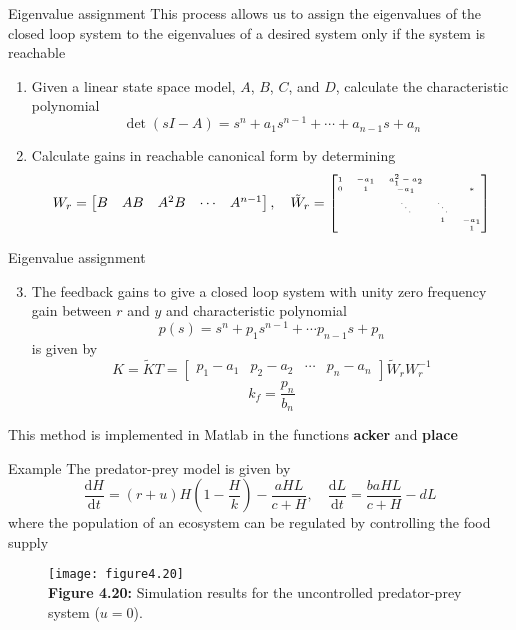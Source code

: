 \documentclass{beamer-control}
\begin{document}
\begin{frame}{Eigenvalue assignment}
This process allows us to assign the eigenvalues of the closed loop system to the eigenvalues of a desired system only if the system is reachable
\begin{enumerate}
	\item Given a linear state space model, $A$, $B$, $C$, and $D$, calculate the characteristic polynomial
	\[\operatorname{det}(sI-A) = s^n+a_1s^{n-1}+\cdots + a_{n-1}s+a_n\]
	\item Calculate gains in reachable canonical form  
	by determining  \[W_r = \begin{bmatrix}
		B & AB & A^2 B & \cdots & A^{n-1}
	\end{bmatrix},\quad \tiny{\tilde{W}_r = \begin{bmatrix}
		1 & -a_1 & a_1^2-a_2 & & \\
		0 & 1 & -a_1 & & * \\
		& & \ddots & \ddots & \\
		&  & & 1 & -a_1 \\
		& & & & 1
	\end{bmatrix}}\]
\end{enumerate}
\end{frame}

\begin{frame}{Eigenvalue assignment}
\begin{enumerate}
	\setcounter{enumi}{2}
	\item The feedback gains to give a closed loop system with unity zero frequency gain between $r$ and $y$ and characteristic polynomial
	\[p(s) = s^n+p_1 s^{n-1}+ \cdots p_{n-1}s+p_n\]
	is given by 
	\[K=\tilde{K}T = \begin{bmatrix}
		p_1-a_1 & p_2-a_2 & \cdots & p_n-a_n
	\end{bmatrix} \tilde{W}_r W_r^{-1}\]
	\[k_f = \frac{p_n}{b_n}\]
\end{enumerate}
This method is implemented in Matlab in the functions \textbf{acker} and \textbf{place}
\end{frame}

\begin{frame}{Example}
The predator-prey model is given by 
\[\frac{\mathrm{d}H}{\mathrm{d}t} = (r+u)H\left(1-\frac{H}{k} \right)-\frac{aHL}{c+H}, \quad \frac{\mathrm{d}L}{\mathrm{d}t} = \frac{baHL}{c+H}-dL\]
where the population of an ecosystem can be regulated by controlling the food supply

\begin{figure}
	\centering
	\texttt{[image: figure4.20]}
	\\
	\textbf{Figure 4.20:} Simulation results for the uncontrolled predator-prey system ($u=0$).
\end{figure}

\end{frame}
\end{document}
